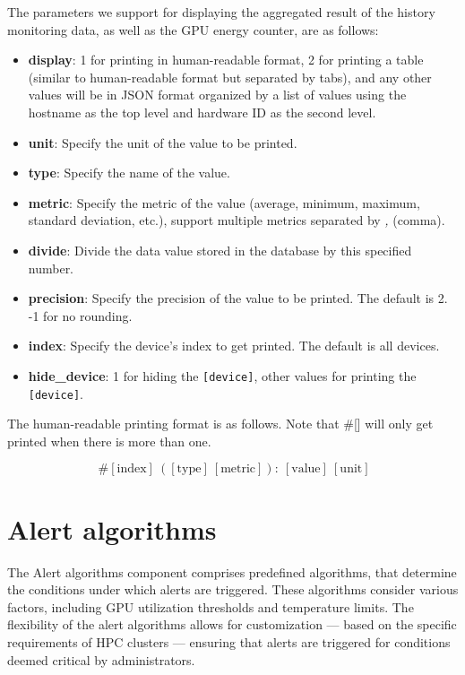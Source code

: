 The parameters we support for displaying the aggregated result of the history monitoring data, as well as the GPU energy counter, are as follows:

\begin{itemize}
    \item \textbf{display}: 1 for printing in human-readable format, 2 for printing a table (similar to human-readable format but separated by tabs), and any other values will be in JSON format organized by a list of values using the hostname as the top level and hardware ID as the second level.
    \item \textbf{unit}: Specify the unit of the value to be printed.
    \item \textbf{type}: Specify the name of the value.
    \item \textbf{metric}: Specify the metric of the value (average, minimum, maximum, standard deviation, etc.), support multiple metrics separated by \textit{,} (comma).
    \item \textbf{divide}: Divide the data value stored in the database by this specified number.
    \item \textbf{precision}: Specify the precision of the value to be printed. The default is 2. -1 for no rounding.
    \item \textbf{index}: Specify the device's index to get printed. The default is all devices.
    \item \textbf{hide\_device}: 1 for hiding the \texttt{[device]}, other values for printing the \texttt{[device]}.
\end{itemize}

The human-readable printing format is as follows. Note that \#[] will only get printed when there is more than one.

\begin{equation*}
[\text{device}]~\#[\text{index}]~([\text{type}] \ [\text{metric}]):~[\text{value}] \ [\text{unit}]
\end{equation*}


\section{Alert algorithms}
\label{sec:algo_method}
The Alert algorithms component comprises predefined algorithms, that determine the conditions under which alerts are triggered. These algorithms consider various factors, including GPU utilization thresholds and temperature limits. The flexibility of the alert algorithms allows for customization --- based on the specific requirements of HPC clusters --- ensuring that alerts are triggered for conditions deemed critical by administrators.

